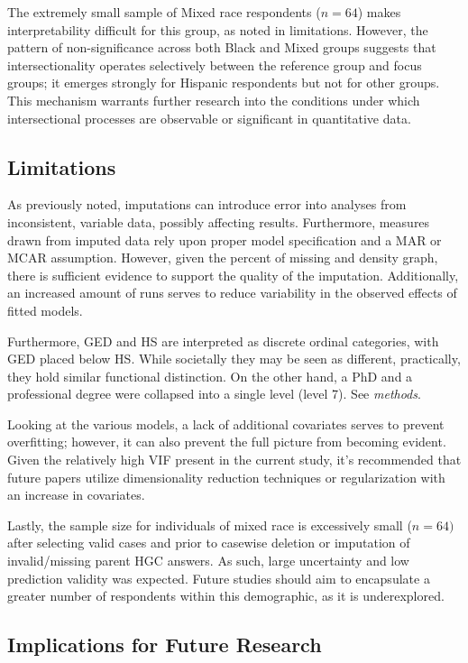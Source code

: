\documentclass[jou,12pt,floatsintext]{apa7}
\begin{document}
The extremely small sample of Mixed race respondents ($n=64$) makes interpretability difficult for this group, as noted in limitations. However, the pattern of non-significance across both Black and Mixed groups suggests that intersectionality operates selectively between the reference group and focus groups; it emerges strongly for Hispanic respondents but not for other groups. This mechanism warrants further research into the conditions under which intersectional processes are observable or significant in quantitative data.

\subsection{Limitations}
As previously noted, imputations can introduce error into analyses from inconsistent, variable data, possibly affecting results. Furthermore, measures drawn from imputed data rely upon proper model specification and a MAR or MCAR assumption. However, given the percent of missing and density graph, there is sufficient evidence to support the quality of the imputation. Additionally, an increased amount of runs serves to reduce variability in the observed effects of fitted models.

Furthermore, GED and HS are interpreted as discrete ordinal categories, with GED placed below HS. While societally they may be seen as different, practically, they hold similar functional distinction. On the other hand, a PhD and a professional degree were collapsed into a single level (level 7). See \textit{methods}.

Looking at the various models, a lack of additional covariates serves to prevent overfitting; however, it can also prevent the full picture from becoming evident. Given the relatively high VIF present in the current study, it's recommended that future papers utilize dimensionality reduction techniques or regularization with an increase in covariates.

Lastly, the sample size for individuals of mixed race is excessively small ($\textit{n}=64)$ after selecting valid cases and prior to casewise deletion or imputation of invalid/missing parent HGC answers. As such, large uncertainty and low prediction validity was expected. Future studies should aim to encapsulate a greater number of respondents within this demographic, as it is underexplored.

\subsection{Implications for Future Research}
\end{document}
